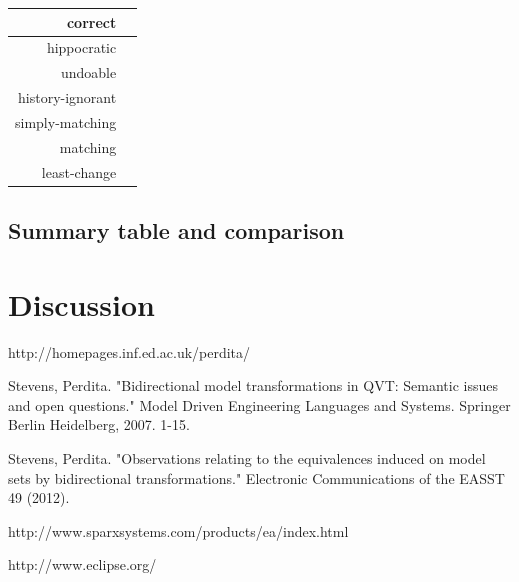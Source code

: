 \documentclass{article}
\begin{document}
\begin{center}
\begin{tabular}{| r | c |}
  \hline                        
  correct & \\
  \hline
  hippocratic & \\
  \hline 
  undoable & \\
  \hline 
  history-ignorant & \\
  \hline 
  simply-matching & \\
  \hline 
  matching & \\
  \hline 
  least-change & \\
  \hline   
\end{tabular}
\end{center}
\pagebreak
\subsection{Summary table and comparison}

\pagebreak
\section{Discussion}

\pagebreak
\begin{thebibliography}{1}

http://homepages.inf.ed.ac.uk/perdita/ 

Stevens, Perdita. "Bidirectional model transformations in QVT: Semantic issues and open questions." Model Driven Engineering Languages and Systems. Springer Berlin Heidelberg, 2007. 1-15.

Stevens, Perdita. "Observations relating to the equivalences induced on model sets by bidirectional transformations." Electronic Communications of the EASST 49 (2012).


http://www.sparxsystems.com/products/ea/index.html

http://www.eclipse.org/


\end{thebibliography}
\end{document}
